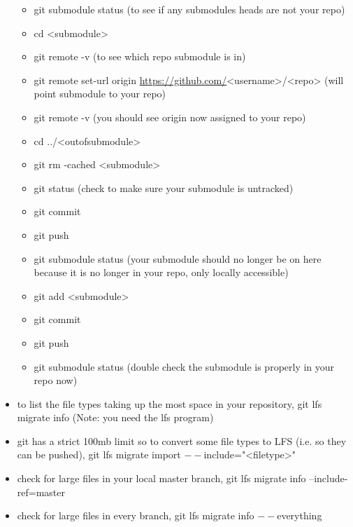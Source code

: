 \documentclass[11pt]{article}
\begin{document}
\begin{itemize}
\begin{itemize}
\item git submodule status (to see if any submodules heads are not your repo)
\item cd <submodule>
\item git remote -v (to see which repo submodule is in)
\item git remote set-url origin \url{https://github.com/}<username>/<repo> (will point submodule to your repo)
\item git remote -v (you should see origin now assigned to your repo)
\item cd ../<outofsubmodule>
\item git rm -cached <submodule>
\item git status (check to make sure your submodule is untracked)
\item git commit
\item git push
\item git submodule status (your submodule should no longer be on here because it is no longer in your repo, only locally accessible)
\item git add <submodule>
\item git commit
\item git push
\item git submodule status (double check the submodule is properly in your repo now)
\end{itemize}
\item to list the file types taking up the most space in your repository, git lfs migrate info (Note: you need the lfs program)
\item git has a strict 100mb limit so to convert some file types to LFS (i.e. so they can be pushed), git lfs migrate import \(--\)include="<filetype>"
\item check for large files in your local master branch, git lfs migrate info --include-ref=master
\item check for large files in every branch, git lfs migrate info \(--\)everything
\end{itemize}
\end{document}
